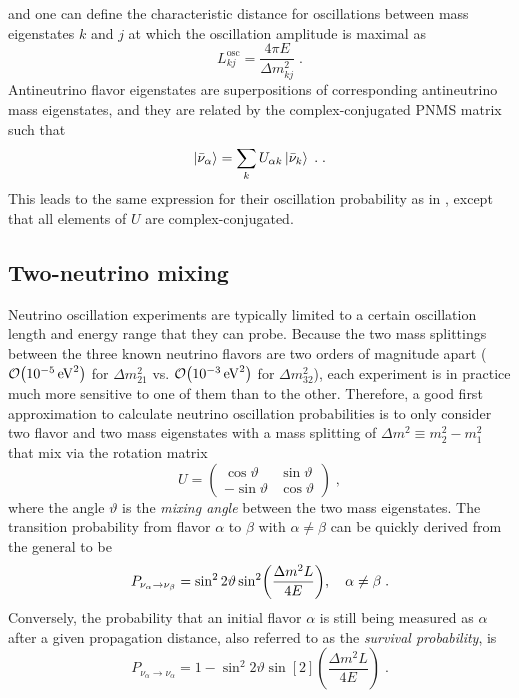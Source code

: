 and one can define the characteristic distance for oscillations between mass eigenstates $k$ and $j$ at which the oscillation amplitude is maximal as
\begin{equation}
    L_{kj}^\mathrm{osc} = \frac{4\pi E}{\Delta m_{kj}^2}\;.
\end{equation}
Antineutrino flavor eigenstates are superpositions of corresponding antineutrino mass eigenstates, and they are related by the complex-conjugated PNMS matrix such that
\begin{equation}
    \ket{\bar{\nu}_\alpha} = \sum_k U_{\alpha k}\ket{\bar{\nu}_k}\;.\label{eq:flavor-state-def-antinu}\;.
\end{equation}
This leads to the same expression for their oscillation probability as in , except that all elements of $U$ are complex-conjugated.

\subsection{Two-neutrino mixing}
Neutrino oscillation experiments are typically limited to a certain oscillation length and energy range that they can probe. Because the two mass splittings between the three known neutrino flavors are two orders of magnitude apart ($\order{\SI{e-5}{eV^2}}$ for $\Delta m^2_{21}$ vs. $\order{\SI{e-3}{eV^2}}$ for $\Delta m^2_{32}$), each experiment is in practice much more sensitive to one of them than to the other. Therefore, a good first approximation to calculate neutrino oscillation probabilities is to only consider two flavor and two mass eigenstates with a mass splitting of $\Delta m^2 \equiv m_2^2 - m_1^2$ that mix via the rotation matrix
\begin{equation}
    U =
    \begin{pmatrix}
        \cos \vartheta & \sin \vartheta \\
        -\sin \vartheta & \cos \vartheta
    \end{pmatrix}\;,\label{eq:two-flav-pnms}
\end{equation}
where the angle $\vartheta$ is the \emph{mixing angle} between the two mass eigenstates. The transition probability from flavor $\alpha$ to $\beta$ with $\alpha \neq \beta$ can be quickly derived from the general  to be
\begin{equation}
    P_{\nu_\alpha \rightarrow \nu_\beta} = \sin^2 2\vartheta \sin[2](\frac{\Delta m^2L}{4E})\qc\alpha \neq \beta\;.
\end{equation}
Conversely, the probability that an initial flavor $\alpha$ is still being measured as $\alpha$ after a given propagation distance, also referred to as the \emph{survival probability}, is
\begin{equation}
    P_{\nu_\alpha \rightarrow \nu_\alpha} = 1 - \sin^2 2\vartheta \sin[2](\frac{\Delta m^2L}{4E})\;.
\end{equation}

